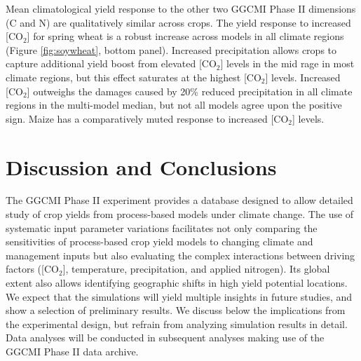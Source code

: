 \documentclass[gmd, manuscript]{copernicus} %
\begin{document}
Mean climatological yield response to the other two GGCMI Phase II dimensions (C and N) are qualitatively similar across crops. 
The yield response to increased [CO$_2$] for spring wheat is a robust increase across models in all climate regions (Figure \ref{fig:soywheat}, bottom panel). 
Increased precipitation allows crops to capture additional yield boost from elevated [CO$_2$] levels in the mid rage in most climate regions, but this effect saturates at the highest [CO$_2$] levels. 
Increased [CO$_2$] outweighs the damages caused by 20\% reduced precipitation in all climate regions in the multi-model median, but not all models agree upon the positive sign.
Maize has a comparatively muted response to increased [CO$_2$] levels. 

\section{Discussion and Conclusions} 
\label{S:5}
The GGCMI Phase II experiment provides a database designed to allow detailed study of crop yields from process-based models under climate change. 
The use of systematic input parameter variations facilitates not only comparing the sensitivities of process-based crop yield models to changing climate and management inputs but also evaluating the complex interactions between driving factors ([CO$_2$], temperature, precipitation, and applied nitrogen). 
Its global extent also allows identifying geographic shifts in high yield potential locations. 
We expect that the simulations will yield multiple insights in future studies, and show a selection of preliminary results. 
We discuss below the implications from the experimental design, but refrain from analyzing simulation results in detail. 
Data analyses will be conducted in subsequent analyses making use of the GGCMI Phase II data archive.
\end{document}

